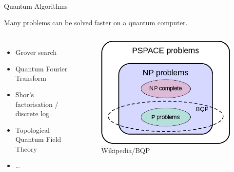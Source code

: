 \begin{frame}{Quantum Algorithms}
 
  Many problems can be solved faster on a quantum computer.
 
 
 \begin{columns}
  \begin{itemize}
   \item<2-> Grover search
   \item<3-> Quantum Fourier Transform
   \item<3-> Shor's factorisation / discrete log 
   \item<4-> Topological Quantum Field Theory
   \item<4-> \dots
  \end{itemize}
  

    \begin{figure}
     \centering
     \includegraphics[width=\linewidth]{gfx/BQP_complexity_class_diagram}
     \caption{\footnotesize Wikipedia/BQP}
    \end{figure}
 \end{columns}

\vspace{\floatsep}

 
\end{frame}

